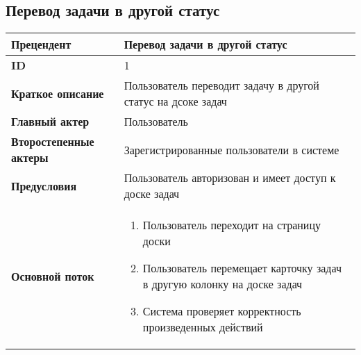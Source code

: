 \documentclass{article}
\begin{document}
\subsection{Перевод задачи в другой статус}

\begin{tabular}{|l|p{9cm}|}
  \hline
  \textbf{Прецендент} & Перевод задачи в другой статус \\
  \hline
  \textbf{ID} & 1 \\
  \hline
  \textbf{Краткое описание} & Пользователь переводит задачу в другой статус на дсоке задач \\
  \hline
  \textbf{Главный актер} & Пользователь\\
  \hline
  \textbf{Второстепенные актеры} & Зарегистрированные пользователи в системе \\
  \hline
  \textbf{Предусловия} &  Пользователь авторизован и имеет доступ к доске задач\\
  \hline
  \textbf{Основной поток} & \begin{enumerate}
    \item Пользователь переходит на страницу доски
    \item Пользователь перемещает карточку задач в другую колонку на доске задач
    \item Система проверяет корректность произведенных действий
  \end{enumerate} \\
  \hline
\end{tabular}


\printnoidxglossaries
\end{document}
